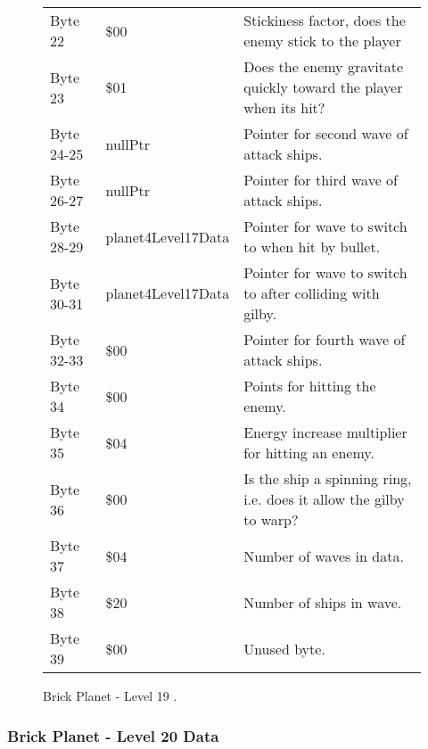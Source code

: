 \begin{figure}[H]
{\begin{adjustbox}{width=12cm}
\begin{tabular}{lll}
 Byte 22    & \$00                        & Stickiness factor, does the enemy stick to the player               \\
 Byte 23    & \$01                        & Does the enemy gravitate quickly toward the player when its hit?    \\
 Byte 24-25 & nullPtr                    & Pointer for second wave of attack ships.                            \\
 Byte 26-27 & nullPtr                    & Pointer for third wave of attack ships.                             \\
 Byte 28-29 & planet4Level17Data         & Pointer for wave to switch to when hit by bullet.                   \\
 Byte 30-31 & planet4Level17Data         & Pointer for  wave to switch to after colliding with gilby.          \\
 Byte 32-33 & \$00                        & Pointer for fourth wave of attack ships.                            \\
 Byte 34    & \$00                        & Points for hitting the enemy.                                       \\
 Byte 35    & \$04                        & Energy increase multiplier for hitting an enemy.                    \\
 Byte 36    & \$00                        & Is the ship a spinning ring, i.e. does it allow the gilby to warp?  \\
 Byte 37    & \$04                        & Number of waves in data.                                            \\
 Byte 38    & \$20                        & Number of ships in wave.                                            \\
 Byte 39    & \$00                        & Unused byte.                                                        \\
\bottomrule
\end{tabular}

  \end{adjustbox}

  }\caption*{Brick Planet - Level 19
.}
\end{figure}

\clearpage
\subsubsection{Brick Planet - Level 20 Data}

